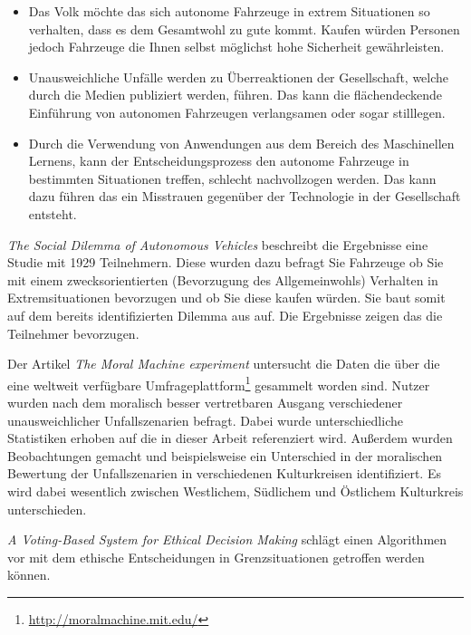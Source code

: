 \begin{itemize}
    \item Das Volk möchte das sich autonome Fahrzeuge in extrem Situationen so verhalten, dass es dem Gesamtwohl zu gute kommt. Kaufen würden Personen jedoch Fahrzeuge die Ihnen selbst möglichst hohe Sicherheit gewährleisten.
    \item Unausweichliche Unfälle werden zu Überreaktionen der Gesellschaft, welche durch die Medien publiziert werden, führen. Das kann die flächendeckende Einführung von autonomen Fahrzeugen verlangsamen oder sogar stilllegen.
    \item Durch die Verwendung von Anwendungen aus dem Bereich des Maschinellen Lernens, kann der Entscheidungsprozess den autonome Fahrzeuge in bestimmten Situationen treffen, schlecht nachvollzogen werden. Das kann dazu führen das ein Misstrauen gegenüber der Technologie in der Gesellschaft entsteht.
\end{itemize}


\textit{The Social Dilemma of Autonomous Vehicles} \cite{socialDilemma} beschreibt die Ergebnisse eine Studie mit 1929 Teilnehmern. Diese wurden dazu befragt Sie Fahrzeuge ob Sie mit einem zwecksorientierten (Bevorzugung des Allgemeinwohls) Verhalten in Extremsituationen bevorzugen und ob Sie diese kaufen würden. Sie baut somit auf dem bereits identifizierten Dilemma aus \cite{roadblocks} auf. Die Ergebnisse zeigen das die Teilnehmer bevorzugen.



Der Artikel \textit{The Moral Machine experiment} \cite{moralMachine} untersucht die Daten die über die eine weltweit verfügbare Umfrageplattform\footnote{\url{http://moralmachine.mit.edu/}} gesammelt worden sind. Nutzer wurden nach dem moralisch besser vertretbaren Ausgang verschiedener unausweichlicher Unfallszenarien befragt. Dabei wurde unterschiedliche Statistiken erhoben auf die in dieser Arbeit referenziert wird. Außerdem wurden Beobachtungen gemacht und beispielsweise ein Unterschied in der moralischen Bewertung der Unfallszenarien in verschiedenen Kulturkreisen identifiziert. Es wird dabei wesentlich zwischen Westlichem, Südlichem und Östlichem Kulturkreis unterschieden.


\textit{A Voting-Based System for Ethical Decision Making} \cite{votingBasedSystem} schlägt einen Algorithmen vor mit dem ethische Entscheidungen in Grenzsituationen getroffen werden können.

\citeauthor{votingBasedSystem}